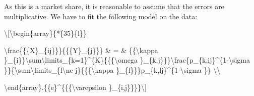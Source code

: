 \documentclass[12pt,twoside,a4paper,notitlepage]{article}
\begin{document}
\raisebox{-28pt}{\textbackslash end\{array\}\textbackslash ]}

As this is a market share, it is reasonable to assume that the errors are multiplicative. We have to fit the following model on the data:

\textbackslash [\textbackslash begin\{array\}\{*\{35\}\{l\}\}

 \textbackslash frac\{\{\{X\}\_\{ij\}\}\}\{\{\{Y\}\_\{j\}\}\} \& = \& \{\{\textbackslash kappa \}\_\{i\}\}\textbackslash sum\textbackslash limits\_\{k=1\}\textasciicircum{}\{K\}\{\{\{\textbackslash omega \}\_\{k,j\}\}\}\textbackslash frac\{p\_\{k,ij\}\textasciicircum{}\{1-\textbackslash sigma \}\}\{\textbackslash sum\textbackslash limits\_\{l\textbackslash ne j\}\{\{\{\textbackslash kappa \}\_\{l\}\}\}p\_\{k,lj\}\textasciicircum{}\{1-\textbackslash sigma \}\} \textbackslash \textbackslash 

\textbackslash end\{array\}.\{\{e\}\textasciicircum{}\{\{\{\textbackslash varepsilon \}\_\{i,j\}\}\}\}\textbackslash ]
\end{document}
